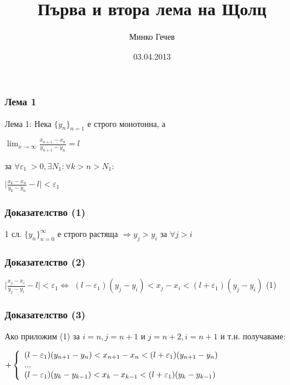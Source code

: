 \documentclass[12pt]{beamer}
\title[Леми на Щолц]{Първа и втора лема на Щолц}
\author{Минко Гечев}
\institute[СУ]
{
Софийски Университет,
Факултет по Математика и Информатика 
\medskip
{\emph{}}
}
\date{03.04.2013}
\begin{document}
\begin{frame}
\titlepage
\end{frame}


\begin{frame}
\frametitle{Лема 1}
\begin{block}
{Лема 1:}
Нека \(\{y_n\}_{n=1}\) е строго монотонна, а
\begin{center}
\(\displaystyle\lim_{x \to \infty} \frac{x_{n+1} - x_n}{y_{n+1} - y_n} = l\)
\end{center}
за \(\forall \varepsilon_1\ > 0, \exists N_1: \forall k > n > N_1:\)
\begin{center}
\(\displaystyle\lvert\frac{x_k - x_n}{y_k - y_n} - l\rvert < \varepsilon_1\)
\end{center}
\end{block}
\end{frame}

\begin{frame}
\frametitle{Доказателство (1)}
\begin{block}
{}
\begin{center}
1 сл. \(\{y_n\}_{n=0}^{\infty}\) е строго растяща
\(\Rightarrow y_j > y_i\) за \(\forall j > i\)
\end{center}
\end{block}
\end{frame}

\begin{frame}
\frametitle{Доказателство (2)}
\begin{block}
{}
\begin{center}
\(\displaystyle\lvert\frac{x_j - x_i}{y_j - y_i} - l\rvert < \varepsilon_1 \Leftrightarrow\)
\((l - \varepsilon_1)(y_j - y_i) < x_j - x_i < (l + \varepsilon_1)(y_j - y_i)\) (1)
\end{center}
\end{block}
\end{frame}

\begin{frame}
\frametitle{Доказателство (3)}
\begin{block}
{}
Ако приложим (1) за \(i = n, j = n + 1\) и \(j = n + 2, i = n + 1\) и т.н. получаваме:
\begin{center}
\(
+\left\{
    \begin{array}{l l}
    (l - \varepsilon_1)(y_{n+1} - y_n) < x_{n+1} - x_n < (l + \varepsilon_1)(y_{n+1} - y_n)\\
    ...\\
    (l - \varepsilon_1)(y_k - y_{k-1}) < x_k - x_{k-1} < (l + \varepsilon_1)(y_k - y_{k-1})
    \end{array} \right.
\)
\end{center}
\end{block}
\end{frame}
\end{document}
